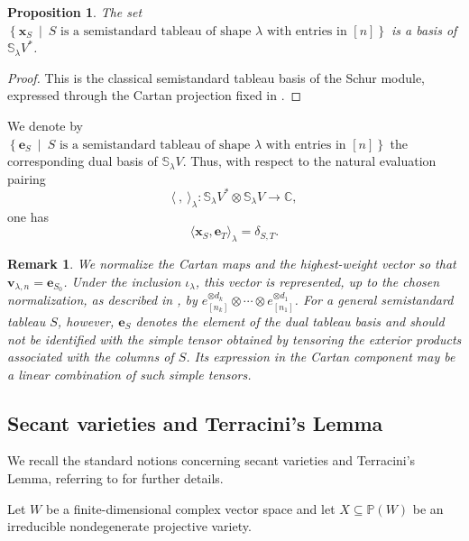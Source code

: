 \documentclass[a4paper,reqno]{amsart}
\theoremstyle{plainnopunct}
\newtheorem{proposition}[proposition]{Proposition}
\theoremstyle{definitionnopunct}
\newtheorem{remark}[remark]{Remark}
\newcommand{\C}{\mathbb{C}}
\renewcommand{\P}{\mathbb{P}}
\renewcommand{\S}{\mathbb{S}}
\newcommand{\be}{\mathbf{e}}
\newcommand{\bx}{\mathbf{x}}
\newcommand{\bv}{\mathbf{v}}
\begin{document}
\begin{proposition}
\label{prop: semistandard tableau basis}
The set $\left\{ \bx_S \ \middle|\ S \text{ is a semistandard tableau of shape $\lambda$ with entries in $[n]$} \right\}$ is a basis of $\S_\lambda V^*$.
\end{proposition}

\begin{proof}
This is the classical semistandard tableau basis of the Schur module, expressed through the Cartan projection fixed in .
\end{proof}

We denote by $\left\{ \be_S \ \middle|\ S \text{ is a semistandard tableau of shape $\lambda$ with entries in $[n]$} \right\}$ the corresponding dual basis of $\S_\lambda V$. Thus, with respect to the natural evaluation pairing
\[
\langle\ ,\ \rangle_\lambda:
\S_\lambda V^*\otimes\S_\lambda V
\longrightarrow
\C,
\]
one has
\begin{equation}
\label{eq: dual tableau bases}
\langle\bx_S,\be_T\rangle_\lambda
=
\delta_{S,T}.
\end{equation}

\begin{remark}
\label{rem: highest weight basis vector}
We normalize the Cartan maps and the highest-weight vector so that $\bv_{\lambda,n}
=
\be_{S_0}$. 
Under the inclusion $\iota_\lambda$, this vector is represented, up to the chosen normalization, as described in , by 
$e_{[n_k]}^{\otimes d_k} \otimes\cdots\otimes e_{[n_1]}^{\otimes d_1}$.
For a general semistandard tableau $S$, however, $\be_S$ denotes the element of the dual tableau basis and should not be identified with the simple tensor obtained by tensoring the exterior products associated with the columns of $S$. Its expression in the Cartan component may be a linear combination of such simple tensors.
\end{remark}

\subsection{Secant varieties and Terracini's Lemma}
\label{subsect: secant and terracini}

We recall the standard notions concerning secant varieties and
Terracini's Lemma, referring to \cite{bernardi_hitchhiker_2018} for further details. 

Let $W$ be a finite-dimensional complex vector space and let $X\subseteq\P(W)$ be an irreducible nondegenerate projective variety.
\end{document}
